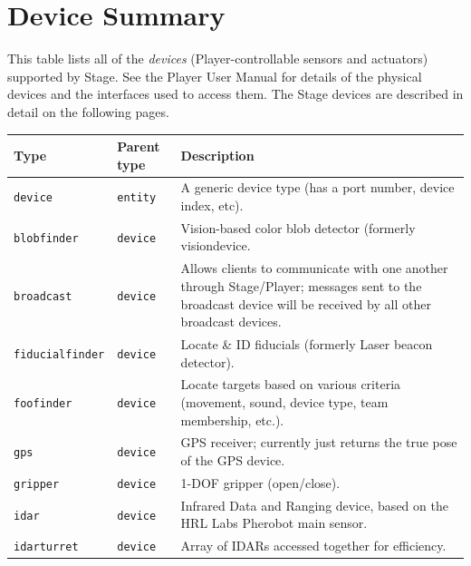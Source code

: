 \documentclass[11pt,twoside]{report}
\begin{document}
\newpage
\section{Device Summary}
\label{sec.ref.devices}

This table lists all of the {\em devices} (Player-controllable sensors
and actuators) supported by Stage.  See the Player User Manual for
details of the physical devices and the interfaces used to access
them. The Stage devices are described in detail on the following
pages.
\vspace{1em}\\\noindent
\begin{tabularx}{\columnwidth}{llX}
\hline 
Type & Parent type & Description \\
\hline

\verb'device' & \verb'entity' & A generic device type (has a port
number, device index, etc). \\

\hline

\verb'blobfinder' & \verb'device' & Vision-based color blob detector
(formerly visiondevice.\\

\verb'broadcast' & \verb'device' & Allows clients to communicate with
one another through Stage/Player; messages sent to the broadcast
device will be received by all other broadcast devices.\\

\verb'fiducialfinder' & \verb'device' & Locate \& ID fiducials (formerly Laser
beacon detector).\\

\verb'foofinder' & \verb'device' & Locate targets based on various criteria (movement, sound, device type, team membership, etc.).\\ 

\verb'gps' & \verb'device' & GPS receiver; currently just returns the
true pose of the GPS device.\\

\verb'gripper' & \verb'device' & 1-DOF gripper (open/close).\\

\verb'idar' & \verb'device' & Infrared Data and Ranging device, based
on the HRL Labs Pherobot main sensor.\\

\verb'idarturret' & \verb'device' & Array of IDARs accessed together
for efficiency.\\


\end{tabularx}
\end{document}

